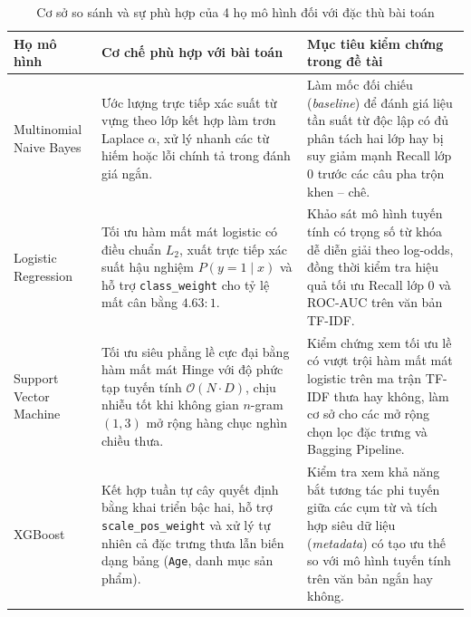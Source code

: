 \begin{table}[H]
\centering
\renewcommand{\arraystretch}{1.15}
\begin{tabularx}{\textwidth}{|>{\raggedright\arraybackslash}p{3.6cm}|X|X|}
\hline
\textbf{Họ mô hình} & \textbf{Cơ chế phù hợp với bài toán} & \textbf{Mục tiêu kiểm chứng trong đề tài} \\ \hline
Multinomial Naive Bayes & Ước lượng trực tiếp xác suất từ vựng theo lớp kết hợp làm trơn Laplace $\alpha$, xử lý nhanh các từ hiếm hoặc lỗi chính tả trong đánh giá ngắn. & Làm mốc đối chiếu (\textit{baseline}) để đánh giá liệu tần suất từ độc lập có đủ phân tách hai lớp hay bị suy giảm mạnh Recall lớp 0 trước các câu pha trộn khen -- chê. \\ \hline
Logistic Regression & Tối ưu hàm mất mát logistic có điều chuẩn $L_2$, xuất trực tiếp xác suất hậu nghiệm $P(y=1 \mid x)$ và hỗ trợ \texttt{class\_weight} cho tỷ lệ mất cân bằng $4.63:1$. & Khảo sát mô hình tuyến tính có trọng số từ khóa dễ diễn giải theo log-odds, đồng thời kiểm tra hiệu quả tối ưu Recall lớp 0 và ROC-AUC trên văn bản TF-IDF. \\ \hline
Support Vector Machine  & Tối ưu siêu phẳng lề cực đại bằng hàm mất mát Hinge với độ phức tạp tuyến tính $\mathcal{O}(N \cdot D)$, chịu nhiễu tốt khi không gian $n$-gram $(1, 3)$ mở rộng hàng chục nghìn chiều thưa. & Kiểm chứng xem tối ưu lề có vượt trội hàm mất mát logistic trên ma trận TF-IDF thưa hay không, làm cơ sở cho các mở rộng chọn lọc đặc trưng và Bagging Pipeline. \\ \hline
XGBoost  & Kết hợp tuần tự cây quyết định bằng khai triển bậc hai, hỗ trợ \texttt{scale\_pos\_weight} và xử lý tự nhiên cả đặc trưng thưa lẫn biến dạng bảng (\texttt{Age}, danh mục sản phẩm). & Kiểm tra xem khả năng bắt tương tác phi tuyến giữa các cụm từ và tích hợp siêu dữ liệu (\textit{metadata}) có tạo ưu thế so với mô hình tuyến tính trên văn bản ngắn hay không. \\ \hline
\end{tabularx}
\caption{Cơ sở so sánh và sự phù hợp của 4 họ mô hình đối với đặc thù bài toán}
\label{tab:model_rationale}
\end{table}

